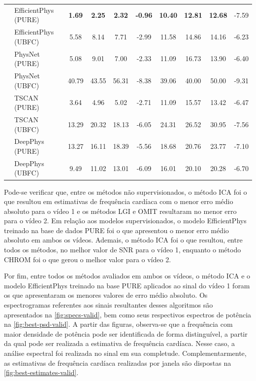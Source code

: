 \begin{table}[h!]
{\begin{tabular}{llcccccccc}
& EfficientPhys (PURE) & \textbf{1.69} & \textbf{2.25} & \textbf{2.32} & \textbf{-0.96} 
                        & \textbf{10.40} & \textbf{12.81} & \textbf{12.68} & -7.59 \\

& EfficientPhys (UBFC) & 5.58 & 8.14 & 7.71 & -2.99 
                       & 11.58 & 14.86 & 14.16 & -6.23 \\

& PhysNet (PURE) & 5.08 & 9.01 & 7.00 & -2.33 
                  & 11.09 & 16.73 & 13.90 & -6.40 \\

& PhysNet (UBFC) & 40.79 & 43.55 & 56.31 & -8.38 
                  & 39.06 & 40.00 & 50.00 & -9.31 \\

& TSCAN (PURE) & 3.64 & 4.96 & 5.02 & -2.71 
                & 11.09 & 15.57 & 13.42 & -6.47 \\

& TSCAN (UBFC) & 13.29 & 20.32 & 18.13 & -6.05 
                & 24.31 & 26.52 & 30.95 & -7.56 \\

& DeepPhys (PURE) & 13.27 & 16.11 & 18.39 & -5.56 
                   & 18.68 & 20.76 & 23.77 & -7.10 \\

& DeepPhys (UBFC) & 9.49 & 11.02 & 13.01 & -6.09 
                   & 16.01 & 20.10 & 20.28 & -6.70 \\

\hline
\end{tabular}
}
\label{tab:rppg_ecg_metrics_valid}
\end{table}


Pode-se verificar que, entre os métodos não supervisionados, o método ICA foi o que resultou em estimativas de frequência cardíaca com o menor erro 
médio absoluto para o vídeo 1 e os métodos LGI e OMIT resultaram no menor erro para o vídeo 2. Em relação aos modelos supervisionados, o modelo EfficientPhys 
treinado na base de dados PURE foi o que apresentou o menor erro médio absoluto em ambos os vídeos. Ademais, o método ICA foi o que resultou, entre todos os métodos, 
no melhor valor de SNR para o vídeo 1, enquanto o método CHROM foi o que gerou o melhor valor para o vídeo 2. 

Por fim, entre todos os métodos avaliados em ambos os vídeos, o método ICA e o modelo EfficientPhys treinado na base PURE aplicados ao sinal do vídeo 1 
foram os que apresentaram os menores valores de erro médio absoluto. Os espectrogramas referentes aos sinais resultantes desses algoritmos são apresentados 
na \autoref{fig:specs-valid}, bem como seus respectivos espectros de potência na \autoref{fig:best-psd-valid}. A partir das figuras, observa-se que a 
frequência com maior densidade de potência pode ser identificada de forma distinguível, a partir da qual pode ser realizada a estimativa de frequência cardíaca. 
Nesse caso, a análise espectral foi realizada no sinal em sua completude. Complementarmente, as estimativas de frequência cardíaca realizadas por janela são 
dispostas na \autoref{fig:best-estimates-valid}.

